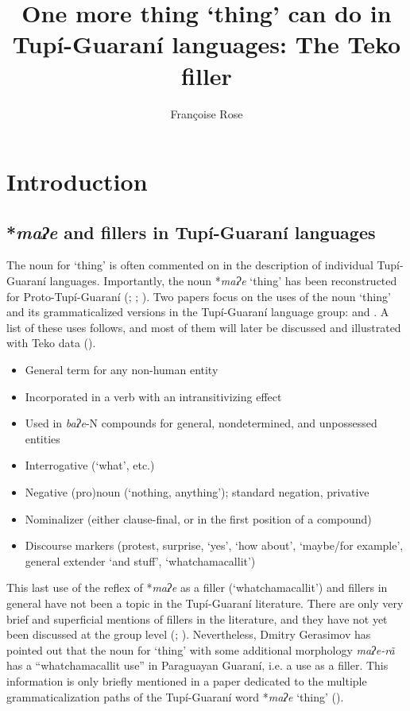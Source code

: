 \documentclass[output=paper]{langscibook}
\author{Françoise Rose\orcid{}\affiliation{Laboratoire Dynamique du Langage (CNRS \& Université Lumière Lyon 2)}}
\title{One more thing ‘thing’ can do in Tupí-Guaraní languages: The Teko filler}
\begin{document}
\maketitle 
{}%

\graphicspath{{figures/rose}}

\section{Introduction}
\label{sec:rose:1}
\subsection{*\textit{maʔe} and fillers in Tupí-Guaraní languages}
\label{sec:rose:1.1}
The noun for ‘thing’ is often commented on in the description of individual Tupí-Guaraní languages. Importantly, the noun *\textit{maɁe} ‘thing’ has been reconstructed for Proto-Tupí-Guaraní (\citealt[36]{Rodrigues1984}; \citealt[536]{Jensen1998}; \citealt[230]{Mello2000}). Two papers focus on the uses of the noun ‘thing’ and its grammaticalized versions in the Tupí-Guaraní language group: \citet{Dietrich1994} and \citet{AuweraAuwera2021}. A list of these uses follows, and most of them will later be discussed and illustrated with Teko data ().

\begin{itemize}
\item General term for any non-human entity 
\item Incorporated in a verb with an intransitivizing effect
\item Used in \textit{baʔe}-N compounds for general, nondetermined, and unpossessed entities
\item Interrogative (‘what’, etc.)
\item Negative (pro)noun (‘nothing, anything’); standard negation, privative
\item Nominalizer (either clause-final, or in the first position of a compound)
\item Discourse markers (protest, surprise, ‘yes’, ‘how about’, ‘maybe/for example’, general extender ‘and stuff’, ‘whatchamacallit’)
\end{itemize}

This last use of the reflex of *\textit{maʔe} as a filler (‘whatchamacallit’) and fillers in general have not been a topic in the Tupí-Guaraní literature. There are only very brief and superficial mentions of fillers in the literature, and they have not yet been discussed at the group level (\citealt{Jensen1999}; \citealt{Rose2023}). Nevertheless, Dmitry Gerasimov has pointed out that the noun for ‘thing’ with some additional morphology \textit{maʔe-rã} has a “whatchamacallit use” in Paraguayan Guaraní, i.e. a use as a filler. This information is only briefly mentioned in a paper dedicated to the multiple grammaticalization paths of the Tupí-Guaraní word *\textit{maʔe} ‘thing’ (\citealt{AuweraAuwera2021}). 
\end{document}
